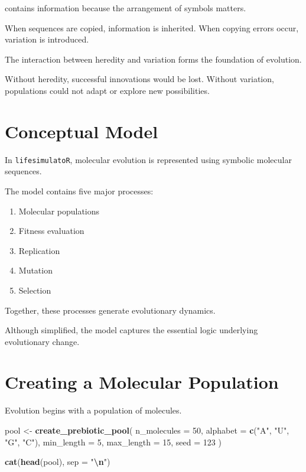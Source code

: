 \documentclass[
  oneside,
  openany]{book}
\newenvironment{Shaded}{\begin{snugshade}}{\end{snugshade}}
\newcommand{\AttributeTok}[1]{\textcolor[rgb]{0.13,0.29,0.53}{#1}}
\newcommand{\DecValTok}[1]{\textcolor[rgb]{0.00,0.00,0.81}{#1}}
\newcommand{\FunctionTok}[1]{\textcolor[rgb]{0.13,0.29,0.53}{\textbf{#1}}}
\newcommand{\NormalTok}[1]{#1}
\newcommand{\OtherTok}[1]{\textcolor[rgb]{0.56,0.35,0.01}{#1}}
\newcommand{\SpecialCharTok}[1]{\textcolor[rgb]{0.81,0.36,0.00}{\textbf{#1}}}
\newcommand{\StringTok}[1]{\textcolor[rgb]{0.31,0.60,0.02}{#1}}
\providecommand{\tightlist}{%
  \setlength{\itemsep}{0pt}\setlength{\parskip}{0pt}}
\begin{document}
contains information because the arrangement of symbols matters.

When sequences are copied, information is inherited. When copying errors occur, variation is introduced.

The interaction between heredity and variation forms the foundation of evolution.

Without heredity, successful innovations would be lost. Without variation, populations could not adapt or explore new possibilities.

\section{Conceptual Model}\label{conceptual-model-1}

In \texttt{lifesimulatoR}, molecular evolution is represented using symbolic molecular sequences.

The model contains five major processes:

\begin{enumerate}
\def\labelenumi{\arabic{enumi}.}
\tightlist
\item
  Molecular populations
\item
  Fitness evaluation
\item
  Replication
\item
  Mutation
\item
  Selection
\end{enumerate}

Together, these processes generate evolutionary dynamics.

Although simplified, the model captures the essential logic underlying evolutionary change.

\section{Creating a Molecular Population}\label{creating-a-molecular-population}

Evolution begins with a population of molecules.

\begin{Shaded}
\begin{Highlighting}[]
\NormalTok{pool }\OtherTok{\textless{}{-}} \FunctionTok{create\_prebiotic\_pool}\NormalTok{(}
  \AttributeTok{n\_molecules =} \DecValTok{50}\NormalTok{,}
  \AttributeTok{alphabet =} \FunctionTok{c}\NormalTok{(}\StringTok{"A"}\NormalTok{, }\StringTok{"U"}\NormalTok{, }\StringTok{"G"}\NormalTok{, }\StringTok{"C"}\NormalTok{),}
  \AttributeTok{min\_length =} \DecValTok{5}\NormalTok{,}
  \AttributeTok{max\_length =} \DecValTok{15}\NormalTok{,}
  \AttributeTok{seed =} \DecValTok{123}
\NormalTok{)}

\FunctionTok{cat}\NormalTok{(}\FunctionTok{head}\NormalTok{(pool), }\AttributeTok{sep =} \StringTok{"}\SpecialCharTok{\textbackslash{}n}\StringTok{"}\NormalTok{)}
\end{Highlighting}
\end{Shaded}
\end{document}
